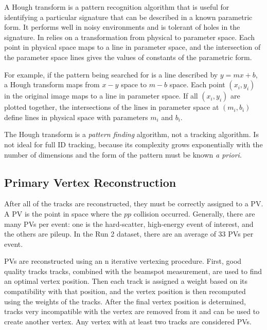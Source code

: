 
A Hough transform is a pattern recognition algorithm that is useful for identifying a particular signature that can be described in a known parametric form. It performs well in noisy environments and is tolerant of holes in the signature. In relies on a transformation from physical to parameter space. Each point in physical space maps to a line in parameter space, and the intersection of the parameter space lines gives the values of constants of the parametric form. 

For example, if the pattern being searched for is a line described by $y = mx + b$, a Hough transform maps from $x-y$ space to $m-b$ space. Each point $(x_i, y_i)$ in the original image maps to a line in parameter space. If all $(x_i, y_i)$ are plotted together, the intersections of the lines in parameter space at $(m_i, b_i)$ define lines in physical space with parameters $m_i$ and $b_i$. 

The Hough transform is a \emph{pattern finding} algorithm, not a tracking algorithm. Is not ideal for full \ac{ID} tracking, because its complexity grows exponentially with the number of dimensions and the form of the pattern must be known \emph{a priori}.



\subsection{Primary Vertex Reconstruction}

After all of the tracks are reconstructed, they must be correctly assigned to a \ac{PV}. A \ac{PV} is the point in space where the $pp$ collision occurred. Generally, there are many \ac{PV}s per event: one is the hard-scatter, high-energy event of interest, and the others are pileup. In the Run 2 dataset, there are an average of 33 \ac{PV}s per event.

\ac{PV}s are reconstructed using an n iterative vertexing procedure. First, good quality tracks tracks, combined with the beamspot measurement, are used to find an optimal vertex position. Then each track is assigned a weight based on its compatibility with that position, and the vertex position is then recomputed using the weights of the tracks. After the final vertex position is determined, tracks very incompatible with the vertex are removed from it and can be used to create another vertex. Any vertex with at least two tracks are considered \ac{PV}s.



